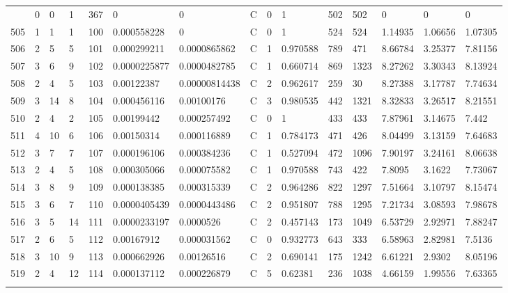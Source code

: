 \begin{latin}
\begin{longtable}{lllllllllllllll}
\begin{comment}
	772 & 0  & 0   & 1  & 367 & 0              & 0              & C & 0  & 1        & 502  & 502  & 0       & 0       & 0       \\
	505 & 1  & 1   & 1  & 100 & 0.000558228    & 0              & C & 0  & 1        & 524  & 524  & 1.14935 & 1.06656 & 1.07305 \\
	506 & 2  & 5   & 5  & 101 & 0.000299211    & 0.0000865862   & C & 1  & 0.970588 & 789  & 471  & 8.66784 & 3.25377 & 7.81156 \\
	507 & 3  & 6   & 9  & 102 & 0.0000225877   & 0.0000482785   & C & 1  & 0.660714 & 869  & 1323 & 8.27262 & 3.30343 & 8.13924 \\
	508 & 2  & 4   & 5  & 103 & 0.00122387     & 0.00000814438  & C & 2  & 0.962617 & 259  & 30   & 8.27388 & 3.17787 & 7.74634 \\
	509 & 3  & 14  & 8  & 104 & 0.000456116    & 0.00100176     & C & 3  & 0.980535 & 442  & 1321 & 8.32833 & 3.26517 & 8.21551 \\
	510 & 2  & 4   & 2  & 105 & 0.00199442     & 0.000257492    & C & 0  & 1        & 433  & 433  & 7.87961 & 3.14675 & 7.442   \\
	511 & 4  & 10  & 6  & 106 & 0.00150314     & 0.000116889    & C & 1  & 0.784173 & 471  & 426  & 8.04499 & 3.13159 & 7.64683 \\
	512 & 3  & 7   & 7  & 107 & 0.000196106    & 0.000384236    & C & 1  & 0.527094 & 472  & 1096 & 7.90197 & 3.24161 & 8.06638 \\
	513 & 2  & 4   & 5  & 108 & 0.000305066    & 0.000075582    & C & 1  & 0.970588 & 743  & 422  & 7.8095  & 3.1622  & 7.73067 \\
	514 & 3  & 8   & 9  & 109 & 0.000138385    & 0.000315339    & C & 2  & 0.964286 & 822  & 1297 & 7.51664 & 3.10797 & 8.15474 \\
	515 & 3  & 6   & 7  & 110 & 0.0000405439   & 0.0000443486   & C & 2  & 0.951807 & 788  & 1295 & 7.21734 & 3.08593 & 7.98678 \\
	516 & 3  & 5   & 14 & 111 & 0.0000233197   & 0.0000526      & C & 2  & 0.457143 & 173  & 1049 & 6.53729 & 2.92971 & 7.88247 \\
	517 & 2  & 6   & 5  & 112 & 0.00167912     & 0.000031562    & C & 0  & 0.932773 & 643  & 333  & 6.58963 & 2.82981 & 7.5136  \\
	518 & 3  & 10  & 9  & 113 & 0.000662926    & 0.00126516     & C & 2  & 0.690141 & 175  & 1242 & 6.61221 & 2.9302  & 8.05196 \\
	519 & 2  & 4   & 12 & 114 & 0.000137112    & 0.000226879    & C & 5  & 0.62381  & 236  & 1038 & 4.66159 & 1.99556 & 7.63365 \\

\end{comment}
\end{longtable}
\end{latin}
